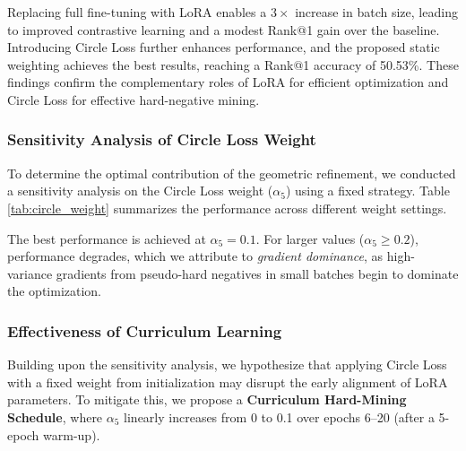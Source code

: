 \documentclass[conference]{IEEEtran}
\begin{document}
Replacing full fine-tuning with LoRA enables a $3\times$ increase in batch size, leading to improved contrastive learning and a modest Rank@1 gain over the baseline. Introducing Circle Loss further enhances performance, and the proposed static weighting achieves the best results, reaching a Rank@1 accuracy of 50.53\%. These findings confirm the complementary roles of LoRA for efficient optimization and Circle Loss for effective hard-negative mining.

\subsubsection{Sensitivity Analysis of Circle Loss Weight}
To determine the optimal contribution of the geometric refinement, we conducted a sensitivity analysis on the Circle Loss weight ($\alpha_5$) using a fixed strategy. Table \ref{tab:circle_weight} summarizes the performance across different weight settings.

\begin{table}[htbp]
    \centering
    \vspace{-0.5em}
    \caption{Sensitivity analysis of Circle Loss weight ($\alpha_5$) on 3000VnPersonSearch with LoRA enabled (Batch Size = 24).}
    \label{tab:circle_weight}
    \vspace{-1.5em}
\end{table}

The best performance is achieved at $\alpha_5=0.1$. For larger values ($\alpha_5 \ge 0.2$), performance degrades, which we attribute to \textit{gradient dominance}, as high-variance gradients from pseudo-hard negatives in small batches begin to dominate the optimization.

\subsubsection{Effectiveness of Curriculum Learning} \label{sec:curriculum_ablation}
Building upon the sensitivity analysis, we hypothesize that applying Circle Loss with a fixed weight from initialization may disrupt the early alignment of LoRA parameters. To mitigate this, we propose a \textbf{Curriculum Hard-Mining Schedule}, where $\alpha_5$ linearly increases from 0 to 0.1 over epochs 6–20 (after a 5-epoch warm-up).
\end{document}
